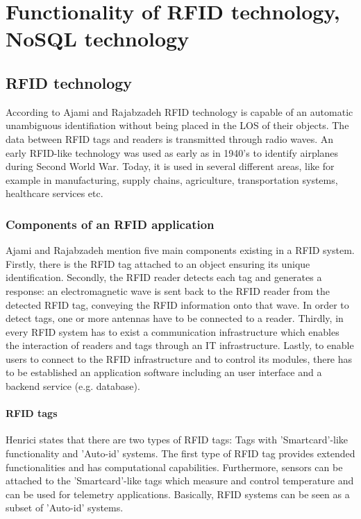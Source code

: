 \chapter{Functionality of RFID technology, NoSQL technology}
\label{Kap2}

\section{RFID technology}

According to Ajami and Rajabzadeh \cite{ncbi} RFID technology is capable of an automatic unambiguous identifiation without being placed in the \ac{LOS} of their objects. The data between RFID tags and readers is transmitted through radio waves. An early RFID-like technology was used as early as in 1940's to identify airplanes during Second World War. Today, it is used in several different areas, like for example in manufacturing, supply chains, agriculture, transportation systems, healthcare services etc. 

\subsection{Components of an RFID application} 

Ajami and Rajabzadeh \cite{ncbi} mention five main components existing in a RFID system. Firstly, there is the RFID tag attached to an object ensuring its unique identification. Secondly, the RFID reader detects each tag and generates a response: an electromagnetic wave is sent back to the RFID reader from the detected RFID tag, conveying the RFID information onto that wave. In order to detect tags, one or more antennas have to be connected to a reader. Thirdly, in every RFID system has to exist a communication infrastructure which enables the interaction of readers and tags through an \ac{IT} infrastructure. Lastly, to enable users to connect to the RFID infrastructure and to control its modules, there has to be established an application software including an user interface and a backend service (e.g. database).

\subsubsection{RFID tags} \label{tag}

Henrici \cite{henrici} states that there are two types of RFID tags: Tags with 'Smartcard'-like functionality and 'Auto-id' systems. The first type of RFID tag provides extended functionalities and has computational capabilities. Furthermore, sensors can be attached to the 'Smartcard'-like tags which measure and control temperature and can be used for telemetry applications. Basically, RFID systems can be seen as a subset of 'Auto-id' systems.


